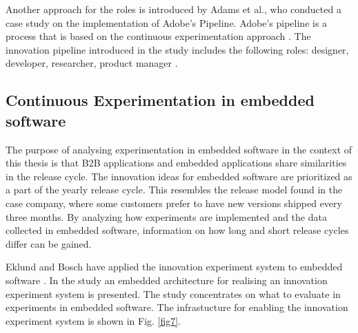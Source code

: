 \documentclass[english]{tktltiki2}
\theoremstyle{definition}
\theoremstyle{remark}
\begin{document}
Another approach for the roles is introduced by Adams et al., who conducted a case study on the implementation of Adobe's Pipeline. Adobe's pipeline is a process that is based on the continuous experimentation approach \cite{adams2013creating, adobe}. The innovation pipeline introduced in the study includes the following roles: designer, developer, researcher, product manager \cite{adobe}.




\subsection{Continuous Experimentation in embedded software}
The purpose of analysing experimentation in embedded software in the context of this thesis is that B2B applications and embedded applications share similarities in the release cycle. The innovation ideas for embedded software are prioritized as a part of the yearly release cycle. This resembles the release model found in the case company, where some customers prefer to have new versions shipped every three months. By analyzing how experiments are implemented and the data collected in embedded software, information on how long and short release cycles differ can be gained. 

Eklund and Bosch have applied the innovation experiment system to embedded software \cite{eklund2012architecture}. In the study an embedded architecture for realising an innovation experiment system is presented. The study concentrates on what to evaluate in experiments in embedded software. The infrastucture for enabling the innovation experiment system is shown in Fig. \ref{fig7}.
\end{document}
